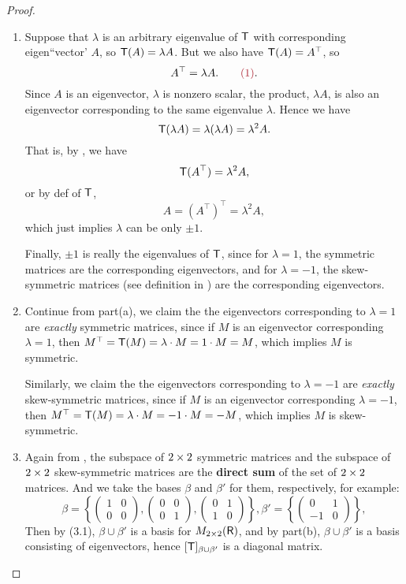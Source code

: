 \begin{proof} \ 

\begin{enumerate}
\item 
Suppose that \(\lambda\) is an arbitrary eigenvalue of \(\textsf{T}\) with corresponding eigen``vector' \(A\), so \(\textsf{T}(A) = \lambda A\).
But we also have \(\textsf{T}(A) = A^\top\), so
\[
    A^\top = \lambda A. \quad \quad \MAROON{(1)}.
\]
Since \(A\) is an eigenvector, \(\lambda\) is nonzero scalar, the product, \(\lambda A\), is also an eigenvector corresponding to the same eigenvalue \(\lambda\).
Hence we have
\[
    \textsf{T}(\lambda A) = \lambda (\lambda A) = \lambda^2 A.
\]
That is, by , we have
\[
    \textsf{T}(A^\top) = \lambda^2 A,
\]
or by def of \(\textsf{T}\),
\[
    A = (A^\top)^\top = \lambda^2 A,
\]
which just implies \(\lambda\) can be only \(\pm 1\).

Finally, \(\pm 1\) is really the eigenvalues of \(\textsf{T}\), since for \(\lambda = 1\), the symmetric matrices are the corresponding eigenvectors, and for \(\lambda = -1\), the skew-symmetric  matrices (see definition in ) are the corresponding eigenvectors.

\item
Continue from part(a), we claim the the eigenvectors corresponding to \(\lambda = 1\) are \emph{exactly} symmetric matrices, since if \(M\) is an eigenvector corresponding \(\lambda = 1\), then \(M^\top = \textsf{T}(M) = \lambda \cdot M = 1 \cdot M = M\), which implies \(M\) is symmetric.

Similarly, we claim the the eigenvectors corresponding to \(\lambda = -1\) are \emph{exactly} skew-symmetric matrices, since if \(M\) is an eigenvector corresponding \(\lambda = -1\), then \(M^\top = \textsf{T}(M) = \lambda \cdot M = -1 \cdot M = -M\), which implies \(M\) is skew-symmetric.

\item Again from , the subspace of \(2 \times 2\) symmetric matrices and the subspace of \(2 \times 2\) skew-symmetric matrices are the \textbf{direct sum} of the set of \(2 \times 2\) matrices.
And we take the bases \(\beta\) and \(\beta'\) for them, respectively, for example:
\[
    \beta = \left\{
        \begin{pmatrix} 1 & 0 \\ 0 & 0 \end{pmatrix},
        \begin{pmatrix} 0 & 0 \\ 0 & 1 \end{pmatrix},
        \begin{pmatrix} 0 & 1 \\ 1 & 0 \end{pmatrix}
    \right\},
    \beta' = \left\{
        \begin{pmatrix} 0 & 1 \\ -1 & 0 \end{pmatrix}
    \right\},
\]
Then by (3.1), \(\beta \cup \beta'\) is a basis for \(M_{2 \times 2}(\textsf{R})\), and by part(b), \(\beta \cup \beta'\) is a basis consisting of eigenvectors, hence \([\textsf{T}]_{\beta \cup \beta'}\) is a diagonal matrix.


\end{enumerate}
\end{proof}
